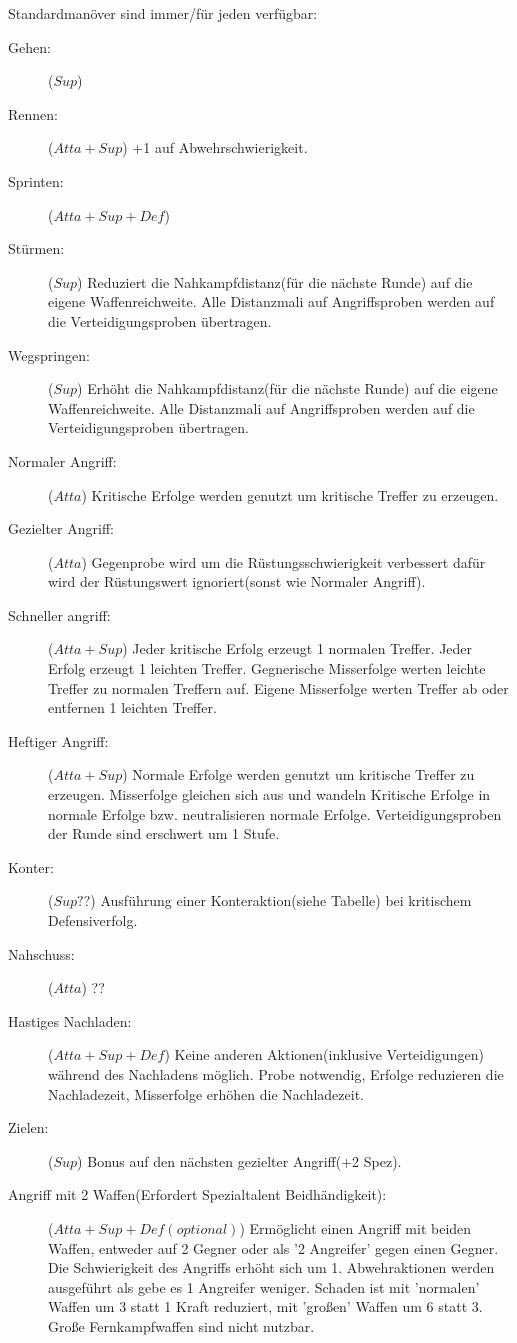 Standardmanöver sind immer/für jeden verfügbar:
\begin{description}
\item[Gehen:] ($Sup$)
\item[Rennen:] ($Atta + Sup$) +1 auf Abwehrschwierigkeit.
\item[Sprinten:] ($Atta + Sup + Def$)

\item[Stürmen:] ($Sup$) Reduziert die Nahkampfdistanz(für die nächste Runde) auf die eigene Waffenreichweite. Alle Distanzmali auf Angriffsproben werden auf die Verteidigungsproben übertragen.
\item[Wegspringen:] ($Sup$) Erhöht die Nahkampfdistanz(für die nächste Runde) auf die eigene Waffenreichweite. Alle Distanzmali auf Angriffsproben werden auf die Verteidigungsproben übertragen.

\item[Normaler Angriff:] ($Atta$) Kritische Erfolge werden genutzt um kritische Treffer zu erzeugen.
\item[Gezielter Angriff:] ($Atta$) Gegenprobe wird um die Rüstungsschwierigkeit verbessert dafür wird der Rüstungswert ignoriert(sonst wie Normaler Angriff).
\item[Schneller angriff:] ($Atta + Sup$) Jeder kritische Erfolg erzeugt 1 normalen Treffer. Jeder Erfolg erzeugt 1 leichten Treffer. Gegnerische Misserfolge werten leichte Treffer zu normalen Treffern auf. Eigene Misserfolge werten Treffer ab oder entfernen 1 leichten Treffer.
\item[Heftiger Angriff:] ($Atta + Sup$) Normale Erfolge werden genutzt um kritische Treffer zu erzeugen. Misserfolge gleichen sich aus und wandeln Kritische Erfolge in normale Erfolge bzw. neutralisieren normale Erfolge. Verteidigungsproben der Runde sind erschwert um 1 Stufe.

\item[Konter:] ($Sup??$) Ausführung einer Konteraktion(siehe Tabelle) bei kritischem Defensiverfolg.

\item[Nahschuss:] ($Atta$) ??
\item[Hastiges Nachladen:] ($Atta + Sup + Def$) Keine anderen Aktionen(inklusive Verteidigungen) während des Nachladens möglich. Probe notwendig, Erfolge reduzieren die Nachladezeit, Misserfolge erhöhen die Nachladezeit.
\item[Zielen:] ($Sup$) Bonus auf den nächsten gezielter Angriff(+2 Spez).

\item[Angriff mit 2 Waffen(Erfordert Spezialtalent Beidhändigkeit):]($Atta + Sup + Def(optional)$) Ermöglicht einen Angriff mit beiden Waffen, entweder auf 2 Gegner oder als '2 Angreifer' gegen einen Gegner. Die Schwierigkeit des Angriffs erhöht sich um 1.
Abwehraktionen werden ausgeführt als gebe es 1 Angreifer weniger.
Schaden ist mit 'normalen' Waffen um 3 statt 1 Kraft reduziert, mit 'großen' Waffen um 6 statt 3.
Große Fernkampfwaffen sind nicht nutzbar.


\end{description}
